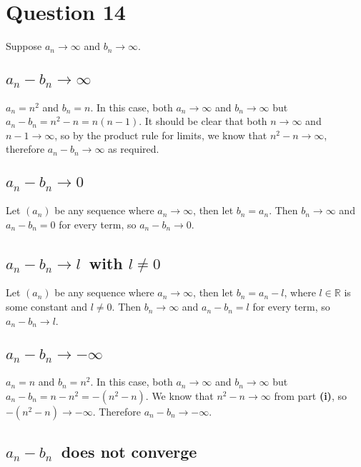 \documentclass[a4paper]{article}
\begin{document}

\section*{Question 14}
\setcounter{section}{14}
\setcounter{subsection}{0}

Suppose $a_n \to \infty$ and $b_n \to \infty$.

\subsection{$a_n - b_n \to \infty$}

$a_n = n^2$ and $b_n = n$. In this case, both $a_n \to \infty$ and $b_n \to \infty$ but $a_n - b_n = n^2 - n = n (n-1)$. It should be clear that both $n \to \infty$ and $n-1 \to \infty$, so by the product rule for limits, we know that $n^2 - n \to \infty$, therefore $a_n - b_n \to \infty$ as required.

\subsection{$a_n - b_n \to 0$}

Let $(a_n)$ be any sequence where $a_n \to \infty$, then let $b_n = a_n$. Then $b_n \to \infty$ and $a_n - b_n = 0$ for every term, so $a_n - b_n \to 0$.

\subsection{$a_n - b_n \to l$\normalfont\ with $l \ne 0$}

Let $(a_n)$ be any sequence where $a_n \to \infty$, then let $b_n = a_n - l$, where $l \in \mathbb R$ is some constant and $l \ne 0$. Then $b_n \to \infty$ and $a_n - b_n = l$ for every term, so $a_n - b_n \to l$.

\subsection{$a_n - b_n \to -\infty$}

$a_n = n$ and $b_n = n^2$. In this case, both $a_n \to \infty$ and $b_n \to \infty$ but $a_n - b_n = n - n^2 = -(n^2 - n)$. We know that $n^2 - n \to \infty$ from part \textbf{(i)}, so $-(n^2 - n) \to -\infty$. Therefore $a_n - b_n \to -\infty$.

\subsection{$a_n - b_n$\normalfont\ does not converge}
\end{document}
